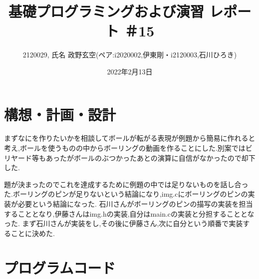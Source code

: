\documentclass[12pt,a4j]{jarticle}
\begin{document}
\title{基礎プログラミングおよび演習 レポート ＃15}
\author{2120029, 氏名 政野玄空(ペア:i2020002,伊東剛・i2120003,石川ひろき)}
\date{2022年2月13日}
\maketitle

\section{構想・計画・設計}

まずなにを作りたいかを相談してボールが転がる表現が例題から簡易に作れると考え,ボールを使うものの中からボーリングの動画を作ることにした.別案ではビリヤード等もあったがボールのぶつかったあとの演算に自信がなかったので却下した.

題が決まったのでこれを達成するために例題の中では足りないものを話し合った.ボーリングのピンが足りないという結論になり,img.cにボーリングのピンの実装が必要という結論になった.
石川さんがボーリングのピンの描写の実装を担当することとなり,伊藤さんはimg.hの実装,自分はmain.cの実装と分担することとなった.
まず石川さんが実装をし,その後に伊藤さん,次に自分という順番で実装することに決めた.

\section{プログラムコード}
\end{document}
